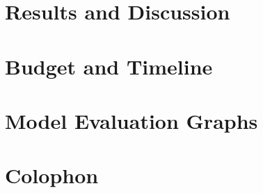 %	

\chapter{Results and Discussion}
	\Mprintcontents
	\label{ch:results}
	
	\stopcontents[chapters]
	\clearpage


\printbibliography

\clearpage

\appendix
\chapter{Budget and Timeline}
	\label{app:budget-timeline}
	
	
\chapter{Model Evaluation Graphs}
	\label{app:model-evaluation-graphs}
	

\backmatter
\chapter{Colophon}
	



